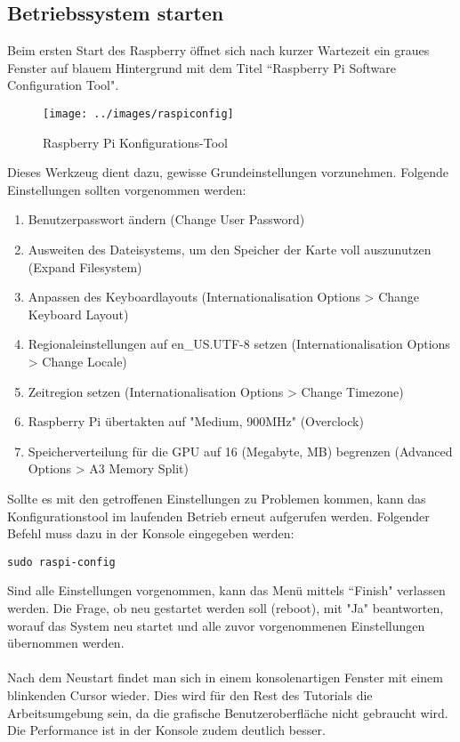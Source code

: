 \subsection{Betriebssystem starten}
Beim ersten Start des Raspberry öffnet sich nach kurzer Wartezeit ein graues Fenster auf blauem Hintergrund mit dem Titel ``Raspberry Pi Software Configuration Tool". 

\begin{figure}[h]
\centering
\texttt{[image: ../images/raspiconfig]}
\caption{Raspberry Pi Konfigurations-Tool}
\end{figure}

Dieses Werkzeug dient dazu, gewisse Grundeinstellungen vorzunehmen. Folgende Einstellungen sollten vorgenommen werden: 

\begin{enumerate}
\item Benutzerpasswort ändern (Change User Password)
\item Ausweiten des Dateisystems, um den Speicher der Karte voll auszunutzen (Expand Filesystem)
\item Anpassen des Keyboardlayouts (Internationalisation Options > Change Keyboard Layout)
\item Regionaleinstellungen auf en\_US.UTF-8 setzen (Internationalisation Options > Change Locale)
\item Zeitregion setzen (Internationalisation Options > Change Timezone) 
\item Raspberry Pi übertakten auf "Medium, 900MHz" (Overclock)
\item Speicherverteilung für die GPU auf 16 (Megabyte, MB) begrenzen (Advanced Options > A3 Memory Split)
\end{enumerate}

Sollte es mit den getroffenen Einstellungen zu Problemen kommen, kann das Konfigurationstool im laufenden Betrieb erneut aufgerufen werden. Folgender Befehl muss dazu in der Konsole eingegeben werden: 

\begin{lstlisting}
sudo raspi-config
\end{lstlisting} 

Sind alle Einstellungen vorgenommen, kann das Menü mittels ``Finish" verlassen werden. Die Frage, ob neu gestartet werden soll (reboot), mit "Ja" beantworten, worauf das System neu startet und alle zuvor vorgenommenen Einstellungen übernommen werden.
\\
\\
Nach dem Neustart findet man sich in einem konsolenartigen Fenster mit einem blinkenden Cursor wieder. Dies wird für den Rest des Tutorials die Arbeitsumgebung sein, da die grafische Benutzeroberfläche nicht gebraucht wird. Die Performance ist in der Konsole zudem deutlich besser.

